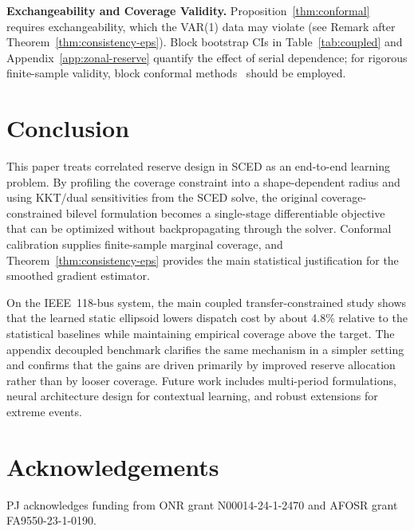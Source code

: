 \documentclass[11pt]{article}
\theoremstyle{definition}
\begin{document}
\textbf{Exchangeability and Coverage Validity.} Proposition~\ref{thm:conformal} requires exchangeability, which the VAR(1) data may violate (see Remark after Theorem~\ref{thm:consistency-eps}). Block bootstrap CIs in Table~\ref{tab:coupled} and Appendix~\ref{app:zonal-reserve} quantify the effect of serial dependence; for rigorous finite-sample validity, block conformal methods~\citep{barber2023conformal} should be employed.

\section{Conclusion}
\label{sec:conclusion}

This paper treats correlated reserve design in SCED as an end-to-end learning problem. By profiling the coverage constraint into a shape-dependent radius and using KKT/dual sensitivities from the SCED solve, the original coverage-constrained bilevel formulation becomes a single-stage differentiable objective that can be optimized without backpropagating through the solver. Conformal calibration supplies finite-sample marginal coverage, and Theorem~\ref{thm:consistency-eps} provides the main statistical justification for the smoothed gradient estimator.

On the IEEE~118-bus system, the main coupled transfer-constrained study shows that the learned static ellipsoid lowers dispatch cost by about 4.8\% relative to the statistical baselines while maintaining empirical coverage above the target. The appendix decoupled benchmark clarifies the same mechanism in a simpler setting and confirms that the gains are driven primarily by improved reserve allocation rather than by looser coverage. Future work includes multi-period formulations, neural architecture design for contextual learning, and robust extensions for extreme events.

\section*{Acknowledgements}
PJ acknowledges funding from ONR grant N00014-24-1-2470 and AFOSR grant FA9550-23-1-0190.



\end{document}
